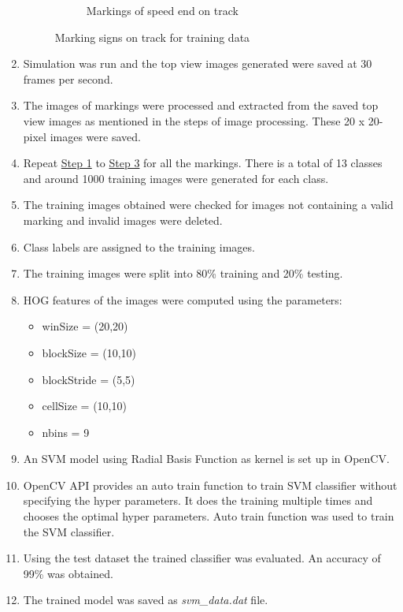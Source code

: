 \begin{enumerate}
\begin{figure}[h!]
\begin{subfigure}{0.5\textwidth}
    \caption{Markings of speed end on track}
    \end{subfigure}
    \caption{Marking signs on track for training data}
    \label{fig:SignsOnTrackForTrainingData}
    \end{figure}
    \item Simulation was run and the top view images generated were saved at 30 frames per second.
    \item The images of markings were processed and extracted from the saved top view images as mentioned in the steps of image processing. These 20 x 20-pixel images were saved.
    \label{enum:StepsToTrainingData3}
    \item Repeat \hyperlink{enum:StepsToTrainingData1}{Step 1} to \hyperlink{enum:StepsToTrainingData1}{Step 3} for all the markings. There is a total of 13 classes and around 1000 training images were generated for each class.
    \item The training images obtained were checked for images not containing a valid marking and invalid images were deleted.
    \item Class labels are assigned to the training images.
    \item The training images were split into 80\% training and 20\% testing.
    \item HOG features of the images were computed using the parameters:
    \begin{itemize}
        \item winSize = (20,20)
        \item blockSize = (10,10)
        \item blockStride = (5,5)
        \item cellSize = (10,10)
        \item nbins = 9
    \end{itemize}
    \item An SVM model using Radial Basis Function as kernel is set up in OpenCV.
    \item OpenCV API provides an auto train function to train SVM classifier without specifying the hyper parameters. It does the training multiple times and chooses the optimal hyper parameters.
Auto train function was used to train the SVM classifier.
    \item Using the test dataset the trained classifier was evaluated. An accuracy of 99\% was obtained.
    \item The trained model was saved as \emph{svm\_data.dat} file.
\end{enumerate}